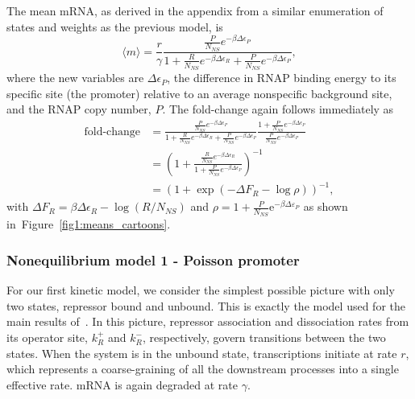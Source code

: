 \documentclass[12pt]{article}%
\newcommand{\fig}[1]{Figure~\ref{#1}}
\begin{document}
The mean mRNA, as derived in the appendix from a similar
enumeration of states and weights as the previous model, is
\begin{equation}
\langle m \rangle = \frac{r}{\gamma}
\frac{\frac{P}{N_{NS}} e^{-\beta\Delta\epsilon_P}}
        {
        1 + \frac{R}{N_{NS}} e^{-\beta\Delta\epsilon_R}
        + \frac{P}{N_{NS}} e^{-\beta\Delta\epsilon_P}
        },
\end{equation}
where the new variables are $\Delta\epsilon_P$, the difference in
RNAP binding energy to its specific site (the promoter) relative
to an average nonspecific background site, and the RNAP copy
number, $P$. The fold-change again follows immediately as
\begin{align}
\text{fold-change}
&= \frac{\frac{P}{N_{NS}} e^{-\beta\Delta\epsilon_P}}
        {
        1 + \frac{R}{N_{NS}} e^{-\beta\Delta\epsilon_R}
        + \frac{P}{N_{NS}} e^{-\beta\Delta\epsilon_P}
        }
\frac{1 + \frac{P}{N_{NS}} e^{-\beta\Delta\epsilon_P}}
        {\frac{P}{N_{NS}} e^{-\beta\Delta\epsilon_P}}
\\
&= \left(
1 + \frac{\frac{R}{N_{NS}} e^{-\beta\Delta\epsilon_R}}
        {1 + \frac{P}{N_{NS}} e^{-\beta\Delta\epsilon_P}}
\right)^{-1}
\\
&= (1 + \exp(-\Delta F_R - \log\rho))^{-1},
\end{align}
with $\Delta F_R = \beta\Delta\epsilon_R - \log(R/N_{NS})$
and $\rho = 1 + \frac{P}{N_{NS}}\mathrm{e}^{-\beta\Delta\varepsilon_P}$
as shown in~\fig{fig1:means_cartoons}.

\subsubsection{Nonequilibrium model 1 - Poisson promoter}
For our first kinetic model, we consider the simplest possible
picture with only two states, repressor bound and unbound.
This is exactly the model used for the main results of~\cite{Jones2014}.
In this picture, repressor association and dissociation rates
from its operator site, $k_R^+$ and $k_R^-$, respectively, govern
transitions between the two states. When the system is in the
unbound state, transcriptions initiate at rate $r$, which
represents a coarse-graining of all the downstream processes into
a single effective rate. mRNA is again degraded at rate $\gamma$.
\end{document}
